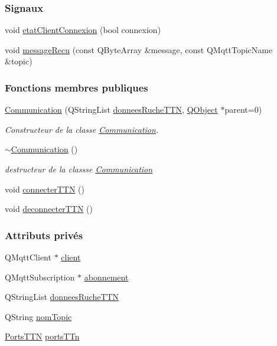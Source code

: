\subsubsection*{Signaux}
\begin{DoxyCompactItemize}
\item 
void \hyperlink{class_communication_aa6100d6b2addece57f3e74c1140a3179}{etat\+Client\+Connexion} (bool connexion)
\item 
void \hyperlink{class_communication_a83865ed4092e263f42669dff0582b7e1}{message\+Recu} (const Q\+Byte\+Array \&message, const Q\+Mqtt\+Topic\+Name \&topic)
\end{DoxyCompactItemize}
\subsubsection*{Fonctions membres publiques}
\begin{DoxyCompactItemize}
\item 
\hyperlink{class_communication_a7376830f5598b7e3c0eb4434a8a8766e}{Communication} (Q\+String\+List \hyperlink{class_communication_a5b7ff98c422c16085e7dc422f2ae51c5}{donnees\+Ruche\+T\+TN}, \hyperlink{class_q_object}{Q\+Object} $\ast$parent=0)
\begin{DoxyCompactList}\small\item\em Constructeur de la classe \hyperlink{class_communication}{Communication}. \end{DoxyCompactList}\item 
\hyperlink{class_communication_a75ba08ce908d45251e28e4c1db94e6f4}{$\sim$\+Communication} ()
\begin{DoxyCompactList}\small\item\em destructeur de la classse \hyperlink{class_communication}{Communication} \end{DoxyCompactList}\item 
void \hyperlink{class_communication_aadec726c44e719fa587bd385533eb559}{connecter\+T\+TN} ()
\item 
void \hyperlink{class_communication_a8d0cc5c992a2b218a64f57429eea001b}{deconnecter\+T\+TN} ()
\end{DoxyCompactItemize}
\subsubsection*{Attributs privés}
\begin{DoxyCompactItemize}
\item 
Q\+Mqtt\+Client $\ast$ \hyperlink{class_communication_a59ae01a54d6c3fde6242c46d802b954b}{client}
\item 
Q\+Mqtt\+Subscription $\ast$ \hyperlink{class_communication_af29011664fbb15b9fb41ce37b70a694f}{abonnement}
\item 
Q\+String\+List \hyperlink{class_communication_a5b7ff98c422c16085e7dc422f2ae51c5}{donnees\+Ruche\+T\+TN}
\item 
Q\+String \hyperlink{class_communication_a7d536b64ee7a5373047c292477d391d5}{nom\+Topic}
\item 
\hyperlink{parametres_8h_a0fe68caa1e9147addc96657cc822b937}{Ports\+T\+TN} \hyperlink{class_communication_aba7a5df723bc632b957b4358bef8605e}{ports\+T\+Tn}
\end{DoxyCompactItemize}


